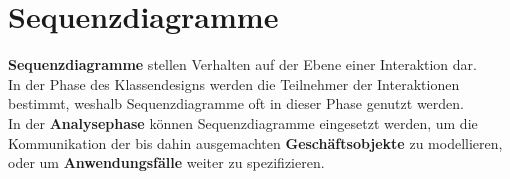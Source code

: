 \section{Sequenzdiagramme}

\begin{tcolorbox}[title=Sequenzdiagramme]
    \textbf{Sequenzdiagramme} stellen Verhalten auf der Ebene einer Interaktion dar.\\
    In der Phase des Klassendesigns werden die Teilnehmer der Interaktionen bestimmt, weshalb Sequenzdiagramme oft in dieser Phase genutzt werden.\\
    In der \textbf{Analysephase} können Sequenzdiagramme eingesetzt werden, um die Kommunikation der bis dahin ausgemachten \textbf{Geschäftsobjekte} zu modellieren, oder um \textbf{Anwendungsfälle} weiter zu spezifizieren.
\end{tcolorbox}